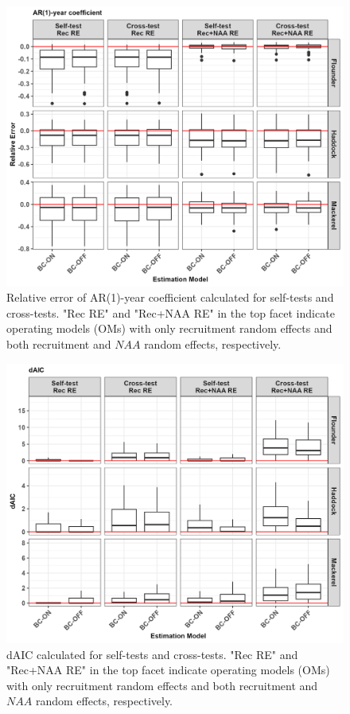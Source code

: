 \documentclass[
  12pt,
]{article}
\begin{document}
\begin{figure}[H]
\centering
\includegraphics[width=\textwidth]{Original_Figures&Tables/Rho.PNG}
\caption{Relative error of AR(1)-year coefficient calculated for self-tests and cross-tests. "Rec RE" and "Rec+NAA RE" in the top facet indicate operating models (OMs) with only recruitment random effects and both recruitment and $NAA$ random effects, respectively.}
\label{fig:supp_ar1}
\end{figure}

\begin{figure}[H]
    \centering
    \includegraphics[width=\textwidth]{Original_Figures&Tables/dAIC.PNG}
    \caption{dAIC calculated for self-tests and cross-tests. "Rec RE" and "Rec+NAA RE" in the top facet indicate operating models (OMs) with only recruitment random effects and both recruitment and $NAA$ random effects, respectively.}
    \label{fig:supp_dAIC}
\end{figure}
\end{document}
